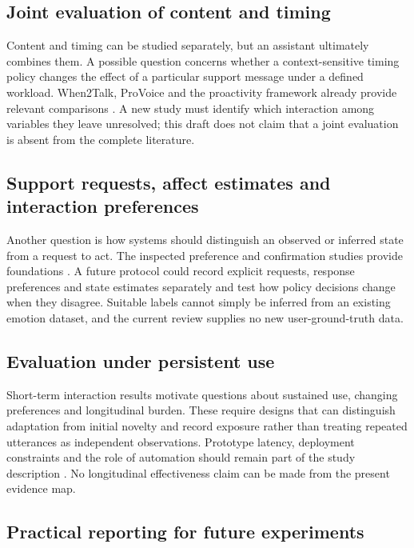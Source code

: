 \documentclass[11pt,a4paper]{article}
\begin{document}
\subsection{Joint evaluation of content and
timing}\label{joint-evaluation-of-content-and-timing}

Content and timing can be studied separately, but an assistant
ultimately combines them. A possible question concerns whether a
context-sensitive timing policy changes the effect of a particular
support message under a defined workload. When2Talk, ProVoice and the
proactivity framework already provide relevant comparisons
\citep{S13, S12, S9}. A new study must identify which interaction among
variables they leave unresolved; this draft does not claim that a joint
evaluation is absent from the complete literature.

\subsection{Support requests, affect estimates and interaction
preferences}\label{support-requests-affect-estimates-and-interaction-preferences}

Another question is how systems should distinguish an observed or
inferred state from a request to act. The inspected preference and
confirmation studies provide foundations \citep{S1, S9, S11, S13}. A
future protocol could record explicit requests, response preferences and
state estimates separately and test how policy decisions change when
they disagree. Suitable labels cannot simply be inferred from an
existing emotion dataset, and the current review supplies no new
user-ground-truth data.

\subsection{Evaluation under persistent
use}\label{evaluation-under-persistent-use}

Short-term interaction results motivate questions about sustained use,
changing preferences and longitudinal burden. These require designs that
can distinguish adaptation from initial novelty and record exposure
rather than treating repeated utterances as independent observations.
Prototype latency, deployment constraints and the role of automation
should remain part of the study description \citep{S5, S10}. No
longitudinal effectiveness claim can be made from the present evidence
map.

\subsection{Practical reporting for future
experiments}\label{practical-reporting-for-future-experiments}
\end{document}
